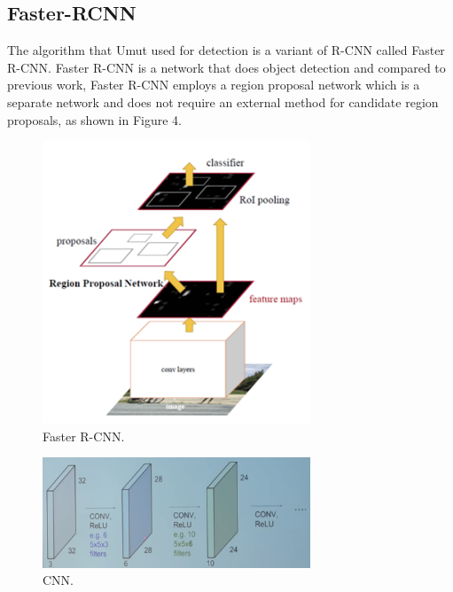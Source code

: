 \documentclass{ndjflart}
\theoremstyle{definition}
\theoremstyle{remark}
\begin{document}
\subsection{Faster-RCNN}\label{ssecacks}
The algorithm that Umut used for detection is a variant of R-CNN called Faster R-CNN. Faster R-CNN is a network that does object detection and compared to previous work, Faster R-CNN employs a region proposal network which is a separate network and does not require an external method for candidate region proposals, as shown in Figure 4.  
\begin{figure}
\begin{center}
\vspace{0.5em}
    \includegraphics[width=8cm]{images/fasterrcnn}
    \vspace{-.5em}
\caption{Faster R-CNN. }
\label{fig:framework}
    \end{center}
\end{figure}

\begin{figure}
\begin{center}
\vspace{0.5em}
    \includegraphics[width=8cm]{images/CNN}
    \vspace{-.5em}
\caption{CNN. }
\label{fig:framework}
    \end{center}
\end{figure}
\end{document}
